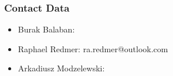 \begin{frame}
    \frametitle{Contact Data}
    \begin{itemize}
        \item Burak Balaban:
        \item Raphael Redmer: ra.redmer@outlook.com
        \item Arkadiusz Modzelewski:
    \end{itemize}
\end{frame}
    
